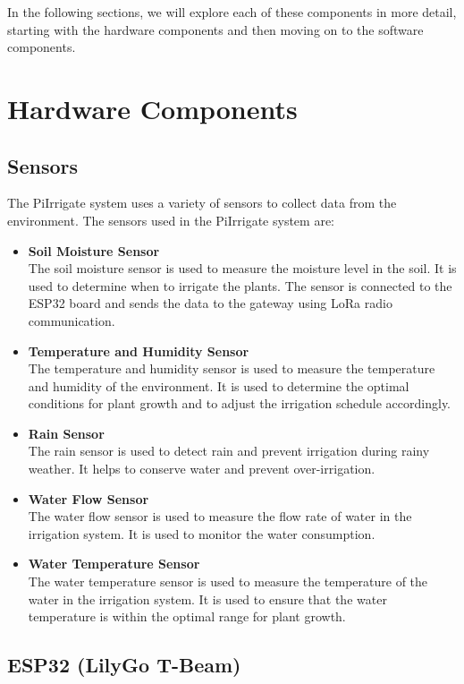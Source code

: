 In the following sections, we will explore each of these components in more detail,
starting with the hardware components and then moving on to the software components.

\section{Hardware Components}
\subsection{Sensors}
The PiIrrigate system uses a variety of sensors to collect data from the environment.
The sensors used in the PiIrrigate system are:
\begin{itemize}
  \item \textbf{Soil Moisture Sensor} \\
  The soil moisture sensor is used to measure the moisture level in the soil. It is used to determine when to irrigate the plants.
  The sensor is connected to the ESP32 board and sends the data to the gateway using LoRa radio communication.

  \item \textbf{Temperature and Humidity Sensor} \\
  The temperature and humidity sensor is used to measure the temperature and humidity of the environment.
  It is used to determine the optimal conditions for plant growth and to adjust the irrigation schedule accordingly.

  \item \textbf{Rain Sensor} \\
  The rain sensor is used to detect rain and prevent irrigation during rainy weather. 
  It helps to conserve water and prevent over-irrigation.

  \item \textbf{Water Flow Sensor} \\
  The water flow sensor is used to measure the flow rate of water in the irrigation system.
  It is used to monitor the water consumption.

  \item \textbf{Water Temperature Sensor} \\
  The water temperature sensor is used to measure the temperature of the water in the irrigation system.
  It is used to ensure that the water temperature is within the optimal range for plant growth.


\end{itemize}
\subsection{ESP32 (LilyGo T-Beam)}

